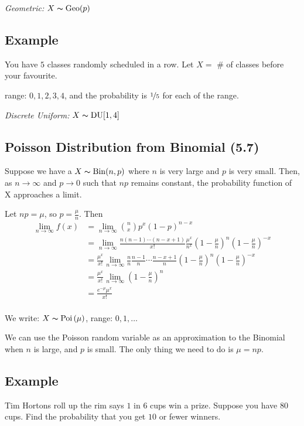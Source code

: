 \emph{Geometric:} $ X \thicksim \operatorname{Geo}(p) $

\subsection{Example}
You have $ 5 $ classes randomly scheduled in a row.
Let $ X= $ \# of classes before your favourite.

range: $ 0,1,2,3,4 $, and the probability is $ \nicefrac{1}{5} $ for each
of the range.

\emph{Discrete Uniform:} $ X \thicksim \operatorname{DU}[1,4] $

\subsection{Poisson Distribution from Binomial (5.7)}
Suppose we have a $ X \thicksim \operatorname{Bin}(n,p) $ where $ n $ is very large
and $ p $ is very small. Then, as $ n\rightarrow \infty $ and $ p\rightarrow 0 $
such that $ np $ remains constant, the probability function of X
approaches a limit.

Let $ np=\mu $, so $ p=\frac{\mu}{n} $. Then
\begin{align*}
    \lim\limits_{{n} \to {\infty}} f\left(x\right)
    &=\lim\limits_{{n} \to {\infty}} \binom{n}{x}p^x\left(1-p\right)^{n-x}\\
    &=\lim\limits_{{n} \to {\infty}} \frac{n\left(n-1\right)\cdots\left(n-x+1\right)}{x!}
    \frac{\mu^x}{n^x} \left(1-\frac{\mu}{n}\right)^n\left(1-\frac{\mu}{n}\right)^{-x}\\
    &=\frac{\mu^x}{x!} \lim\limits_{{n} \to {\infty}} \frac{n}{n}
    \frac{n-1}{n} \cdots \frac{n-x+1}{n}\left(1-\frac{\mu}{n}\right)^n\left(1-\frac{\mu}{n}\right)^{-x}\\
    &=\frac{\mu^x}{x!} \lim\limits_{{n} \to {\infty}} \left(1-\frac{\mu}{n}\right)^n\\
    &=\frac{e^{-\mu}\mu^x}{x!}\\
\end{align*}

We write: $ X \thicksim \operatorname{Poi}\left(\mu\right) $, range: $ 0,1,\ldots $

We can use the Poisson random variable as an approximation to the Binomial
when $ n $ is large, and $ p $ is small. The only thing we need to do
is $ \mu=np $.

\subsection{Example}
Tim Hortons roll up the rim says $ 1 $ in $ 6 $ cups win a prize. Suppose
you have $ 80 $ cups. Find the probability that you get $ 10 $ or fewer
winners.

